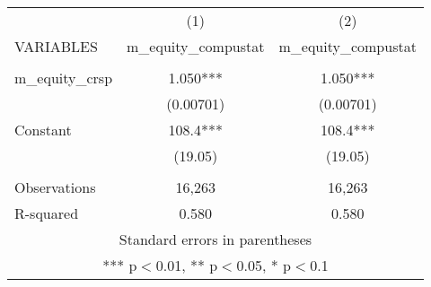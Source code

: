 \documentclass[]{article}
\begin{document}
\begin{tabular}{lcc} \hline
 & (1) & (2) \\
VARIABLES & m\_equity\_compustat & m\_equity\_compustat \\ \hline
 &  &  \\
m\_equity\_crsp & 1.050*** & 1.050*** \\
 & (0.00701) & (0.00701) \\
Constant & 108.4*** & 108.4*** \\
 & (19.05) & (19.05) \\
 &  &  \\
Observations & 16,263 & 16,263 \\
 R-squared & 0.580 & 0.580 \\ \hline
\multicolumn{3}{c}{ Standard errors in parentheses} \\
\multicolumn{3}{c}{ *** p$<$0.01, ** p$<$0.05, * p$<$0.1} \\
\end{tabular}
\end{document}

